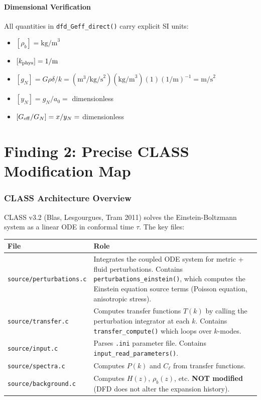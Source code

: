 \documentclass[11pt]{article}
\theoremstyle{definition}
\theoremstyle{remark}
\newcommand{\Geff}{G_{\rm eff}}
\begin{document}
\subsection{Dimensional Verification}

All quantities in \texttt{dfd\_Geff\_direct()} carry explicit SI units:
\begin{itemize}
\item $[\rho_b] = \text{kg/m}^3$
\item $[k_{\rm phys}] = 1/\text{m}$
\item $[g_N] = G\rho\delta/k = (\text{m}^3/\text{kg/s}^2)(\text{kg/m}^3)(1)(1/\text{m})^{-1} = \text{m/s}^2$ \checkmark
\item $[y_N] = g_N/a_0 = $ dimensionless \checkmark
\item $[\Geff/G_N] = x/y_N = $ dimensionless \checkmark
\end{itemize}


\part{Finding 2: Precise CLASS Modification Map}
\label{part:class-map}

\section{CLASS Architecture Overview}

CLASS v3.2 (Blas, Lesgourgues, Tram 2011) solves the Einstein-Boltzmann
system as a linear ODE in conformal time $\tau$. The key files:

\begin{center}
\begin{tabular}{lp{9cm}}
\toprule
File & Role \\
\midrule
\texttt{source/perturbations.c} & Integrates the coupled ODE system
  for metric + fluid perturbations. Contains \texttt{perturbations\_einstein()},
  which computes the Einstein equation source terms (Poisson equation,
  anisotropic stress). \\
\texttt{source/transfer.c} & Computes transfer functions $T(k)$ by
  calling the perturbation integrator at each $k$. Contains
  \texttt{transfer\_compute()} which loops over $k$-modes. \\
\texttt{source/input.c} & Parses \texttt{.ini} parameter file. Contains
  \texttt{input\_read\_parameters()}. \\
\texttt{source/spectra.c} & Computes $P(k)$ and $C_\ell$ from transfer
  functions. \\
\texttt{source/background.c} & Computes $H(z)$, $\rho_b(z)$, etc.
  \textbf{NOT modified} (DFD does not alter the expansion history). \\
\bottomrule
\end{tabular}
\end{center}
\end{document}

